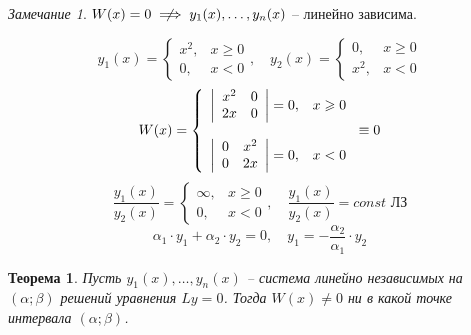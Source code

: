 \documentclass[11pt,a4paper,oneside]{report}
\theoremstyle{definition}
\theoremstyle{plain}
\newtheorem{theorem}{Теорема}[section]
\theoremstyle{remark}
\newtheorem*{remark}{Замечание}
\begin{document}
\begin{remark}
    $W(x) = 0 \centernot\implies y_1(x),\ldots,y_n(x)$ -- линейно зависима.

    \begin{equation*}
        y_1(x) = \left\{\begin{array}{ll}
            x^2, & x \geqslant 0 \\
            0,   & x < 0
        \end{array}\right., \quad y_2(x) = \left\{\begin{array}{ll}
            0,   & x \geqslant 0 \\
            x^2, & x < 0
        \end{array}\right.
    \end{equation*}
    \begin{equation*}
        W(x) = \left\{\begin{array}{ll}
            \left|\begin{array}{cc}
                      x^2 & 0 \\
                      2x  & 0
                  \end{array}\right| = 0, & x \geqslant 0 \\
            \empty                                        \\
            \left|\begin{array}{cc}
                      0 & x^2 \\
                      0 & 2x
                  \end{array}\right| = 0, & x < 0
        \end{array}\right. \equiv 0
    \end{equation*}
    \begin{equation*}
        \frac{y_1(x)}{y_2(x)} = \left\{\begin{array}{ll}
            \infty, & x \geqslant 0 \\
            0,      & x < 0
        \end{array}\right., \quad \frac{y_1(x)}{y_2(x)} = const\text{ ЛЗ}
    \end{equation*}
    \begin{equation*}
        \alpha_1\cdot y_1 + \alpha_2 \cdot y_2 = 0, \quad y_1 = - \frac{\alpha_2}{\alpha_1} \cdot y_2
    \end{equation*}
\end{remark}

\begin{theorem}
    Пусть $y_1(x), \ldots, y_n(x)$ -- система линейно независимых на $(\alpha;\beta)$ решений уравнения $Ly = 0$. Тогда $W(x) \ne 0$ ни в какой точке интервала $(\alpha;\beta)$.
\end{theorem}
\end{document}

